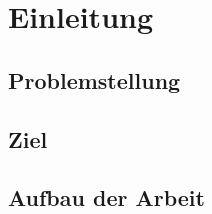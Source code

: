 \chapter{Einleitung}
\label{ch:intro}
\section{Problemstellung}
\label{sec:introContext}

\section{Ziel}
\label{sec:introGoal}

\section{Aufbau der Arbeit}
\label{sec:introSetup}
